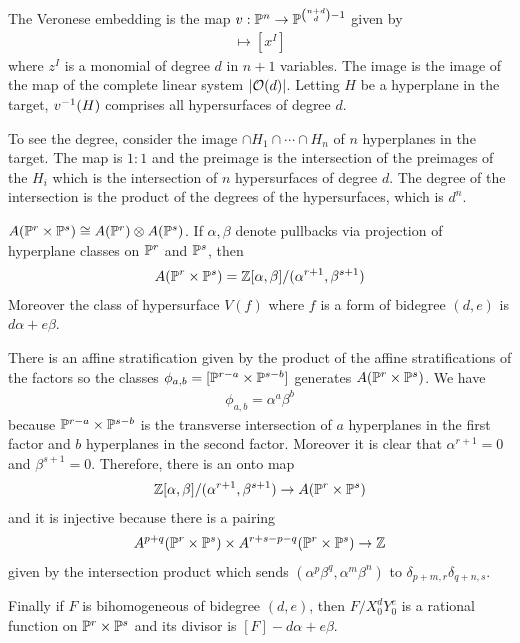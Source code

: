 \documentclass[12pt]{article}
\begin{document}
\begin{example}
    The Veronese embedding is the map $v:\P^n \to \P^{\binom{n+d}{d}-1}$ given by 
    \begin{align*}
        [x_0:\cdots:x_n] \mapsto [x^I]
    \end{align*}
    where $z^I$ is a monomial of degree $d$ in $n+1$ variables. The image is the image of the 
    map of the complete linear system $|\mc{O}(d)|$. Letting $H$ be a 
    hyperplane in the target, $\inv{v}(H)$ comprises all hypersurfaces of degree $d$.

    \hfill 

    To see the degree, consider the image $\cap H_1 \cap \cdots \cap H_n$ of $n$ hyperplanes in the target.
    The map is $1:1$ and the preimage is the intersection of the preimages of the $H_i$ which is the intersection of $n$ hypersurfaces
    of degree $d$. The degree of the intersection is the product of the degrees of the hypersurfaces, which is $d^n$.
\end{example}

\begin{example}
    $A(\P^r\times \P^s) \cong A(\P^r)\otimes A(\P^s)$. If $\alpha,\beta$ denote pullbacks via projection of hyperplane
    classes on $\P^r$ and $\P^s$, then \begin{align*}
        A(\P^r\times \P^s) = \Z[\alpha,\beta]/(\alpha^{r+1},\beta^{s+1})
    \end{align*} Moreover the class of hypersurface $V(f)$ where $f$ is a form of bidegree $(d,e)$ is $d\alpha + e\beta$.

    \hfill

    There is an affine stratification given by the product of the affine stratifications of the factors
    so the classes $\phi_{a,b} = [\P^{r-a} \times \P^{s-b}]$ generates $A(\P^r\times \P^s)$. We have \begin{align*}
        \phi_{a,b} = \alpha^a\beta^b
    \end{align*} because $\P^{r-a} \times \P^{s-b}$ is the transverse intersection of $a$ hyperplanes in the first factor and $b$ hyperplanes in the second factor.
    Moreover it is clear that $\alpha^{r+1} = 0$ and $\beta^{s+1} = 0$. Therefore, there is an onto map \begin{align*}
        \Z[\alpha,\beta]/(\alpha^{r+1},\beta^{s+1}) \to A(\P^r\times \P^s)
    \end{align*} and it is injective because there is a pairing \begin{align*}
        A^{p+q}(\P^r\times\P^s) \times A^{r+s-p-q}(\P^r\times\P^s) \to \Z
    \end{align*} given by the intersection product which sends $(\alpha^p\beta^q,\alpha^m\beta^n)$ to $\delta_{p+m,r}\delta_{q+n,s}$.

    \hfill

    Finally if $F$ is bihomogeneous of bidegree $(d,e)$, then $F/X_0^dY_0^e$ is a rational function on $\P^r\times\P^s$ and its divisor is $[F] - d\alpha + e\beta$.
\end{example}
\end{document}

